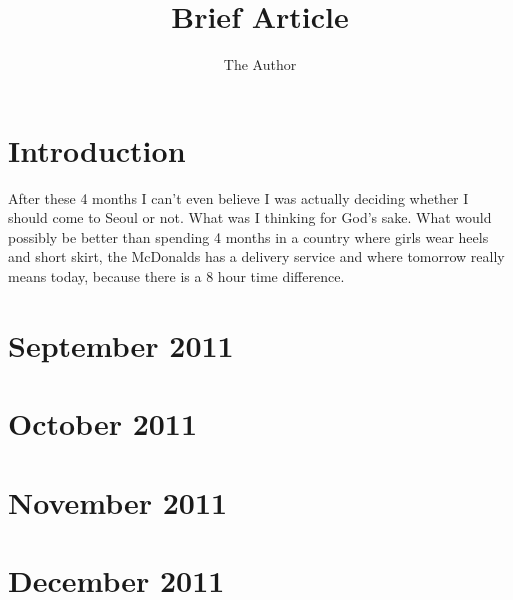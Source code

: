 \documentclass[11pt,twoside,a5paper,landscape,openright]{book}
\title{Brief Article}
\author{The Author}
\newcommand{\newmonth}[2]{
	\def\monthstuff{#2}
	\chapter{#1}
    \def\monthstuff{}
	\startcontents[sections]
	\printcontents[sections]{l}{1}{{\setcounter{tocdepth}{1}}}
	\vfill
}
\def\monthstuff{}
\begin{document}



\chapter*{Introduction}
After these 4 months I can't even believe I was actually deciding whether I should come to Seoul or not. What was I thinking for God's sake. What would possibly be better than spending 4 months in a country where girls wear heels and short skirt, the McDonalds has a delivery service and where tomorrow really means today, because there is a 8 hour time difference.

\tableofcontents

\newmonth{September 2011}{``So it begins...''}



\newmonth{October 2011}{``I wonder if you know, how they live in Tokyo...''}



\newmonth{November 2011}{``The most expensive month so far...''}

%

\chapter{December 2011}
\end{document}
